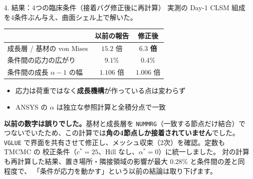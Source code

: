 \documentclass[aspectratio=169,11pt]{beamer}
\begin{document}
\begin{frame}{4. 結果：4つの臨床条件（接着バグ修正後に再計算）}
\small 実測の Day-1 CLSM 組成を4条件ぶん与え、曲面シェル上で解いた。
\vspace{4pt}
\begin{center}\small
\begin{tabular}{@{}lcc@{}}
\toprule
 & 以前の報告 & \textbf{修正後} \\
\midrule
成長層 / 基材の von Mises & $15.2$ 倍 & $\mathbf{6.3}$ \textbf{倍} \\
条件間の応力の広がり & $9.1\%$ & $\mathbf{0.4\%}$ \\
条件間の成長 $\alpha-1$ の幅 & $1.106$ 倍 & $1.006$ 倍 \\
\bottomrule
\end{tabular}
\end{center}
\vspace{4pt}
\begin{itemize}\small
  \item 応力は荷重ではなく\textbf{成長機構}が作っている点は変わらず
  \item ANSYS の $\alpha$ は独立な参照計算と全積分点で一致
\end{itemize}
\vspace{4pt}
\begin{center}
\colorbox{cwarn!12}{\parbox{0.93\linewidth}{\footnotesize
\textbf{以前の数字は誤りでした。}基材と成長層を \texttt{NUMMRG}（一致する節点だけ結合）で
つないでいたため、この計算では\textbf{角の4節点しか接着されていません}でした。
\texttt{VGLUE} で界面を共有させて修正し、メッシュ収束（2次）を確認。定数も TMCMC の
校正条件（$c^*=25$、Hill なし、$\alpha^*=0$）に統一しました。
対の計算も再計算した結果、置き場所・隣接領域の影響が最大 0.28\% と条件間の差と同程度で、
「条件が応力を動かす」という以前の結論は取り下げます。}}
\end{center}
\end{frame}
\end{document}
